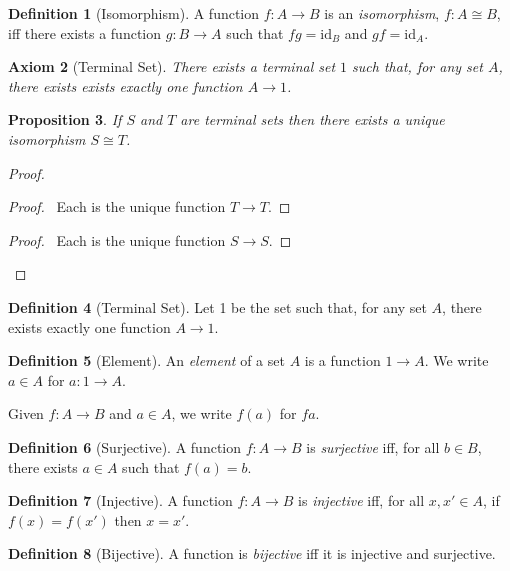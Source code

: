 \documentclass{book}
\let\qed\relax
\newtheorem{ax}{Axiom}[chapter]
\newtheorem{prop}[ax]{Proposition}
\theoremstyle{definition}
\newtheorem{df}[ax]{Definition}
\begin{document}
\begin{df}[Isomorphism]
A function $f : A \rightarrow B$ is an \emph{isomorphism}, $f : A \cong B$, iff there exists a function $g : B \rightarrow A$ such that $fg = \mathrm{id}_B$ and $gf = \mathrm{id}_A$.
\end{df}

\begin{ax}[Terminal Set]
There exists a \emph{terminal} set $1$ such that, for any set $A$, there exists exists exactly one function $A \rightarrow 1$.
\end{ax}

\begin{prop}
If $S$ and $T$ are terminal sets then there exists a unique isomorphism $S \cong T$.
\end{prop}

\begin{proof}
\pf
{}
\begin{proof}
	\pf\ Each is the unique function $T \rightarrow T$.
\end{proof}
\begin{proof}
	\pf\ Each is the unique function $S \rightarrow S$.
\end{proof}
\qed
\end{proof}

\begin{df}[Terminal Set]
Let 1 be the set such that, for any set $A$, there exists exactly one function $A \rightarrow 1$.
\end{df}

\begin{df}[Element]
An \emph{element} of a set $A$ is a function $1 \rightarrow A$. We write $a \in A$ for $a : 1 \rightarrow A$.

Given $f : A \rightarrow B$ and $a \in A$, we write $f(a)$ for $fa$.
\end{df}

\begin{df}[Surjective]
A function $f : A \rightarrow B$ is \emph{surjective} iff, for all $b \in B$, there exists $a \in A$ such that $f(a) = b$.
\end{df}

\begin{df}[Injective]
A function $f : A \rightarrow B$ is \emph{injective} iff, for all $x, x' \in A$, if $f(x) = f(x')$ then $x = x'$.
\end{df}

\begin{df}[Bijective]
A function is \emph{bijective} iff it is injective and surjective.
\end{df}
\end{document}
